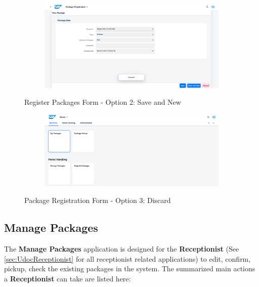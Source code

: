 \begin{figure}[htb!]
	\centering
    \begin{subfigure}{0.95\linewidth}
        \centering
        \includegraphics[width=1\linewidth]{images/user_doc/registration/saveAndNewToast.png}
    \end{subfigure}
    \caption{Register Packages Form - Option 2: Save and New}
    \label{fig:RPsaveNewOp}
\end{figure}

\begin{figure}[H]
	\centering
    \begin{subfigure}{0.95\linewidth}
        \centering
        \includegraphics[width=1\linewidth]{images/user_doc/registration/discardTarget.png}
    \end{subfigure}
    \caption{Package Registration Form - Option 3: Discard}
    \label{fig:RPdiscardOp}
\end{figure}

\bigskip
\subsection{Manage Packages}                     
\label{subsec:mp}

The \textbf{Manage Packages} application is designed for the \textbf{Receptionist} (See \autoref{sec:UdocReceptionist} for all receptionist related applications) to edit, confirm, pickup, check the existing packages in the system. The summarized main actions a \textbf{Receptionist} can take are listed here:

